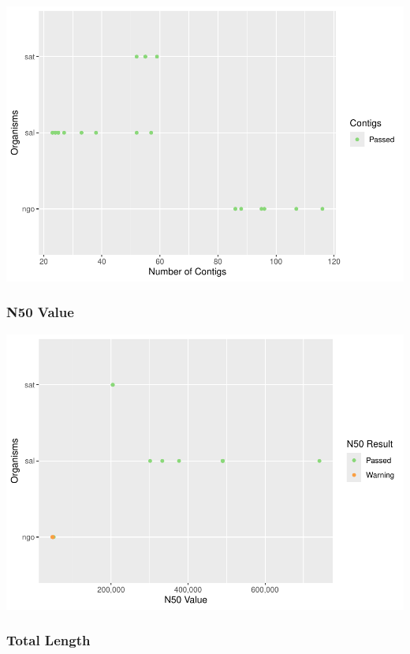 \documentclass[
  a4paper,
]{article}
\begin{document}
\includegraphics{qualifyr_report_2024-08-02_files/figure-latex/unnamed-chunk-1-1.pdf}

\subsubsection{N50 Value}\label{n50-value}

\includegraphics{qualifyr_report_2024-08-02_files/figure-latex/n50_result -1.pdf}

\subsubsection{Total Length}\label{total-length}
\end{document}
